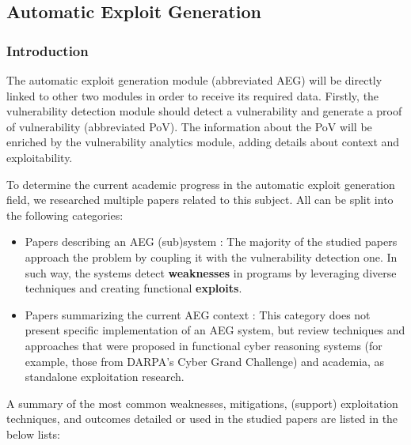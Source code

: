 \documentclass[12pt,a4paper,english,onecolumn]{IEEEtran}
\begin{document}
\subsection{Automatic Exploit Generation}

\subsubsection{Introduction}

The automatic exploit generation module (abbreviated AEG) will be directly linked to other two modules in order to receive its required data. Firstly, the vulnerability detection module should detect a vulnerability and generate a proof of vulnerability (abbreviated PoV). The information about the PoV will be enriched by the vulnerability analytics module, adding details about context and exploitability.

To determine the current academic progress in the automatic exploit generation field, we researched multiple papers related to this subject. All can be split into the following categories:

\begin{itemize}
    \item Papers describing an AEG (sub)system \cite{aig} \cite{mayhem} \cite{bop} \cite{bof_aeg}: The majority of the studied papers approach the problem by coupling it with the vulnerability detection one. In such way, the systems detect \textbf{weaknesses} in programs by leveraging diverse techniques and creating functional \textbf{exploits}.
    \item Papers summarizing the current AEG context \cite{crs_aeg_survey} \cite{alphahacking} \cite{code_reuse_survey}: This category does not present specific implementation of an AEG system, but review techniques and approaches that were proposed in functional cyber reasoning systems (for example, those from DARPA's Cyber Grand Challenge) and academia, as standalone exploitation research.
\end{itemize}

A summary of the most common weaknesses, mitigations, (support) exploitation techniques, and outcomes detailed or used in the studied papers are listed in the below lists:
\end{document}
